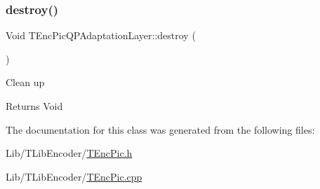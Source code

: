 \subsubsection{\texorpdfstring{destroy()}{destroy()}}
{\footnotesize\ttfamily Void T\+Enc\+Pic\+Q\+P\+Adaptation\+Layer\+::destroy (\begin{DoxyParamCaption}{ }\end{DoxyParamCaption})}

Clean up \begin{DoxyReturn}{Returns}
Void 
\end{DoxyReturn}


The documentation for this class was generated from the following files\+:\begin{DoxyCompactItemize}
\item 
Lib/\+T\+Lib\+Encoder/\hyperlink{_t_enc_pic_8h}{T\+Enc\+Pic.\+h}\item 
Lib/\+T\+Lib\+Encoder/\hyperlink{_t_enc_pic_8cpp}{T\+Enc\+Pic.\+cpp}\end{DoxyCompactItemize}
